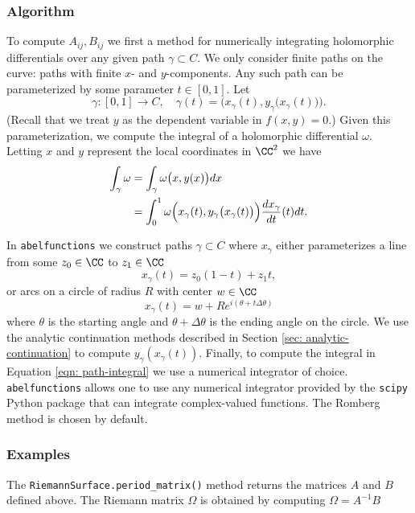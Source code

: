 
%
\subsubsection*{Algorithm}
%

To compute $A_{ij}, B_{ij}$ we first a method for numerically
integrating holomorphic differentials over any given path $\gamma
\subset C$. We only consider finite paths on the curve: paths with
finite $x$- and $y$-components. Any such path can be parameterized by
some parameter $t \in [0,1]$. Let
\[
    \gamma : [0,1] \to C, \quad \gamma(t) = \Big( x_\gamma(t),
    y_\gamma\big(x_\gamma(t)\big) \Big).
\]
(Recall that we treat $y$ as the dependent variable in $f(x,y)=0$.)
Given this parameterization, we compute the integral of a holomorphic
differential $\omega$. Letting $x$ and $y$ represent the local
coordinates in $\CC^2$ we have
\begin{align}
    \int_\gamma \omega
    &=
    \int_\gamma \omega\big(x,y(x)\big)dx \notag \\
    &=
    \int_0^1 \omega \Big(
    x_\gamma(t), y_\gamma\big(x_\gamma(t)\big) \Big)
    \frac{dx_\gamma}{dt}(t) dt. \label{eqn: path-integral}
\end{align}

In {\tt abelfunctions} we construct paths $\gamma \subset C$ where
$x_\gamma$ either parameterizes a line from some $z_0\in\CC$ to
$z_1\in\CC$
\[
    x_\gamma(t) = z_0(1-t) + z_1t,
\]
or arcs on a circle of radius $R$ with center $w\in\CC$
\[
    x_\gamma(t) = w + Re^{i(\theta + t \Delta \theta)}
\]
where $\theta$ is the starting angle and $\theta + \Delta \theta$ is the
ending angle on the circle. We use the analytic continuation methods
described in Section \ref{sec: analytic-continuation} to compute
$y_\gamma(x_\gamma(t))$. Finally, to compute the integral in Equation
\eqref{eqn: path-integral} we use a numerical integrator of choice. {\tt
  abelfunctions} allows one to use any numerical integrator provided by
the {\tt scipy} Python package that can integrate complex-valued
functions. The Romberg method \cite{wiki:Romberg} is chosen by default.

%
\subsubsection*{Examples}
%

The \verb=RiemannSurface.period_matrix()= method returns the matrices
$A$ and $B$ defined above. The Riemann matrix $\Omega$ is obtained by
computing $\Omega = A^{-1}B$

